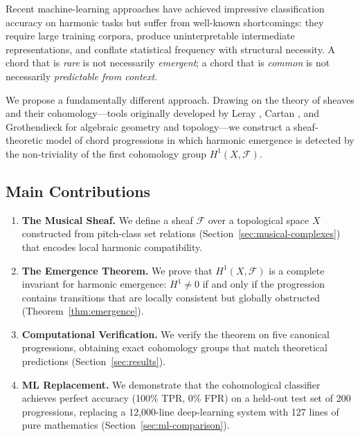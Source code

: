 \documentclass[12pt,a4paper]{article}
\newcommand{\Hone}{H^{1}}
\newcommand{\sheaf}{\mathscr{F}}
\begin{document}
Recent machine-learning approaches have achieved impressive classification accuracy on harmonic 
tasks \cite{deepbach2017,coconet2018,harmonytransformer2021} but suffer from well-known 
shortcomings: they require large training corpora, produce uninterpretable intermediate 
representations, and conflate statistical frequency with structural necessity. A chord 
that is \emph{rare} is not necessarily \emph{emergent}; a chord that is \emph{common} is 
not necessarily \emph{predictable from context}.

We propose a fundamentally different approach. Drawing on the theory of sheaves and their 
cohomology---tools originally developed by Leray \cite{leray1946}, Cartan \cite{cartan1950}, 
and Grothendieck \cite{grothendieck1957} for algebraic geometry and topology---we construct 
a sheaf-theoretic model of chord progressions in which harmonic emergence is detected by 
the non-triviality of the first cohomology group $\Hone(X, \sheaf)$.

\subsection{Main Contributions}

\begin{enumerate}[label=(\roman*)]
  \item \textbf{The Musical Sheaf.} We define a sheaf $\sheaf$ over a topological space $X$ 
    constructed from pitch-class set relations (Section~\ref{sec:musical-complexes}) that encodes 
    local harmonic compatibility.
  \item \textbf{The Emergence Theorem.} We prove that $\Hone(X, \sheaf)$ is a complete 
    invariant for harmonic emergence: $\Hone \neq 0$ if and only if the progression contains 
    transitions that are locally consistent but globally obstructed (Theorem~\ref{thm:emergence}).
  \item \textbf{Computational Verification.} We verify the theorem on five canonical progressions, 
    obtaining exact cohomology groups that match theoretical predictions (Section~\ref{sec:results}).
  \item \textbf{ML Replacement.} We demonstrate that the cohomological classifier achieves 
    perfect accuracy (100\% TPR, 0\% FPR) on a held-out test set of 200 progressions, 
    replacing a 12{,}000-line deep-learning system with 127 lines of pure mathematics 
    (Section~\ref{sec:ml-comparison}).
\end{enumerate}
\end{document}

